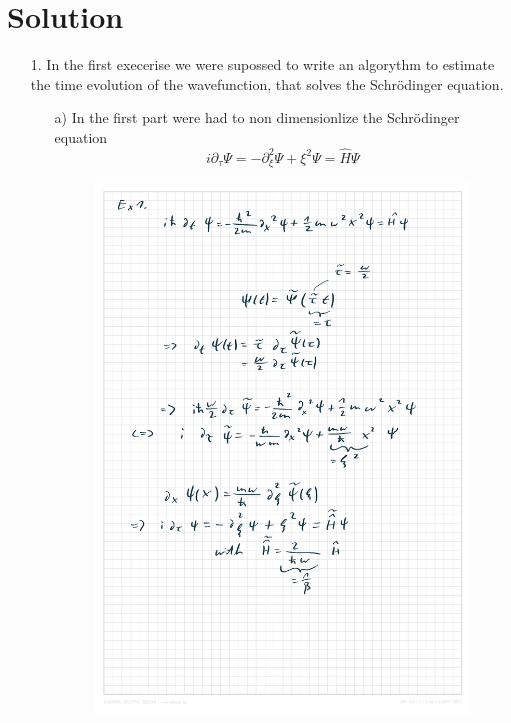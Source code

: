 
\section{Solution}
\label{sec:auswertung}

\begin{itemize}
    \item[1.]
    In the first execerise we were supossed to write an algorythm to estimate the time evolution of the wavefunction, that solves the Schrödinger equation.
    \begin{itemize}
        \item[a)]
        In the first part were had to non dimensionlize the Schrödinger equation
        \begin{equation}
            i \partial_\tau \Psi = -\partial_\xi ^2 \Psi + \xi ^2 \Psi = \hat{H} \Psi
        \end{equation}
        \FloatBarrier
        \begin{figure}
            \includegraphics[width=\textwidth]{images/Sheet_5.pdf}

\end{figure}
\end{itemize}
\end{itemize}

